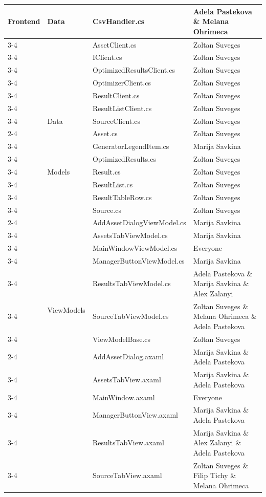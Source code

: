 \begin{longtable}{|p{1.5cm}|p{2cm}|p{5.4cm}|p{4.5cm}|}
\multirow{8}{*}{Frontend} &\multirow{8}{*}{Data} & CsvHandler.cs & Adela Pastekova \& Melana Ohrimeca\\
\cline{3-4}
& & AssetClient.cs & Zoltan Suveges\\
\cline{3-4}
& & IClient.cs & Zoltan Suveges\\
\cline{3-4}
& & OptimizedResultsClient.cs & Zoltan Suveges\\
\cline{3-4}
& & OptimizerClient.cs & Zoltan Suveges\\
\cline{3-4}
& & ResultClient.cs & Zoltan Suveges\\
\cline{3-4}
& & ResultListClient.cs & Zoltan Suveges\\
\cline{3-4}
\multirow{26}{*}{Frontend} & Data & SourceClient.cs & Zoltan Suveges\\
\cline{2-4}
&\multirow{7}{*}{Models} & Asset.cs & Zoltan Suveges\\
\cline{3-4}
& & GeneratorLegendItem.cs & Marija Savkina\\
\cline{3-4}
& & OptimizedResults.cs & Zoltan Suveges\\
\cline{3-4}
& & Result.cs & Zoltan Suveges\\
\cline{3-4}
& & ResultList.cs & Zoltan Suveges\\
\cline{3-4}
& & ResultTableRow.cs & Zoltan Suveges\\
\cline{3-4}
& & Source.cs & Zoltan Suveges\\
\cline{2-4}
&\multirow{10}{*}{ViewModels} & AddAssetDialogViewModel.cs & Marija Savkina\\
\cline{3-4}
& & AssetsTabViewModel.cs & Marija Savkina\\
\cline{3-4}
& & MainWindowViewModel.cs & Everyone\\
\cline{3-4}
& & ManagerButtonViewModel.cs & Marija Savkina\\
\cline{3-4}
& & ResultsTabViewModel.cs & Adela Pastekova \& Marija Savkina \& Alex Zalanyi\\
\cline{3-4}
& & SourceTabViewModel.cs & Zoltan Suveges \& Melana Ohrimeca \& Adela Pastekova\\
\cline{3-4}
& & ViewModelBase.cs & Zoltan Suveges\\
\cline{2-4}
&\multirow{11}{*}{Views} & AddAssetDialog.axaml & Marija Savkina \& Adela Pastekova\\
\cline{3-4}
& & AssetsTabView.axaml & Marija Savkina \& Adela Pastekova\\
\cline{3-4}
& & MainWindow.axaml & Everyone\\
\cline{3-4}
& & ManagerButtonView.axaml & Marija Savkina \& Adela Pastekova\\
\cline{3-4}
& & ResultsTabView.axaml & Marija Savkina \& Alex Zalanyi \& Adela Pastekova\\
\cline{3-4}
& & SourceTabView.axaml & Zoltan Suveges \& Filip Tichy \& Melana Ohrimeca\\
\hline
\end{longtable}

